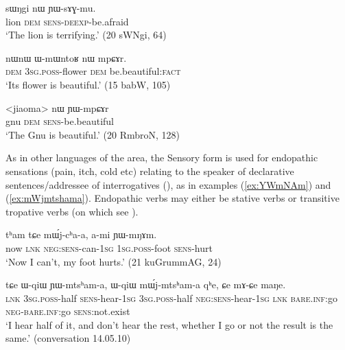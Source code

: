 \documentclass[oldfontcommands,oneside,a4paper,11pt]{article}
\newcommand{\ipa}[1]{{\phon \mbox{#1}}} %
\newcommand{\refb}[1]{(\ref{#1})}
\newcommand{\factual}[1]{\textsc{:fact}}
\begin{document}
\begin{exe}
\ex \label{ex:YWsAGmu}
\gll 
\ipa{sɯŋgi}  	\ipa{nɯ}  	\ipa{ɲɯ-sɤɣ-mu.}  \\
lion \textsc{dem} \textsc{sens-deexp}-be.afraid \\
\glt `The lion is terrifying.' (20 sWNgi, 64)
\end{exe}


\begin{exe}
\ex \label{ex:mpCAr}
\gll
\ipa{nɯnɯ}  	\ipa{ɯ-mɯntoʁ}  	\ipa{nɯ}  	\ipa{mpɕɤr.}  \\
\textsc{dem} \textsc{3sg.poss}-flower \textsc{dem} be.beautiful\factual{} \\
\glt `Its flower is beautiful.' (15 babW, 105)
\end{exe}


\begin{exe}
\ex \label{ex:YWmpCAr}
\gll 
<jiaoma> 	\ipa{nɯ}  	\ipa{ɲɯ-mpɕɤr}  \\
gnu \textsc{dem} \textsc{sens}-be.beautiful \\
\glt `The Gnu is beautiful.' (20 RmbroN, 128)
\end{exe}

As in other languages of the area, the Sensory form is used for endopathic sensations (pain, itch, cold etc)  relating to the speaker of declarative sentences/addressee of interrogatives (\citealt{tournadre14evidentiality}), as in examples \refb{ex:YWmNAm} and \refb{ex:mWjmtshama}. Endopathic verbs may either be stative verbs or transitive tropative verbs (on which see \citealt{jacques13tropative}).

\begin{exe}
\ex \label{ex:YWmNAm}
\gll
\ipa{tʰam} 	\ipa{tɕe} 	\ipa{mɯ́j-cʰa-a,} 	\ipa{a-mi} 	\ipa{ɲɯ-mŋɤm.} \\
now \textsc{lnk} \textsc{neg:sens}-can-\textsc{1sg} \textsc{1sg.poss}-foot \textsc{sens}-hurt \\
\glt `Now I can't, my foot hurts.' (21 kuGrummAG, 24)
\end{exe}

\begin{exe}
\ex \label{ex:mWjmtshama}
\gll
\ipa{tɕe} 	\ipa{ɯ-qiɯ} 	\ipa{ɲɯ-mtsʰam-a,} 	\ipa{ɯ-qiɯ} 	\ipa{mɯ́j-mtsʰam-a} 	\ipa{qʰe,} 	\ipa{ɕe} 	\ipa{mɤ-ɕe} 	\ipa{maŋe.} \\
\textsc{lnk} \textsc{3sg.poss}-half \textsc{sens}-hear-\textsc{1sg}   \textsc{3sg.poss}-half \textsc{neg:sens}-hear-\textsc{1sg}  \textsc{lnk}  \textsc{bare.inf}:go \textsc{neg}-\textsc{bare.inf}:go \textsc{sens}:not.exist \\
\glt `I hear half of it, and don't hear the rest, whether I go or not the result is the same.' (conversation 14.05.10)
\end{exe}
\end{document}
